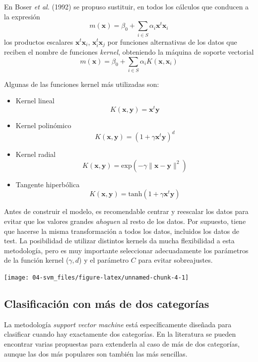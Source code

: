 \documentclass[
]{book}
\theoremstyle{break}
\theoremstyle{definition}
\theoremstyle{definition}
\theoremstyle{definition}
\theoremstyle{remark}
\begin{document}
En Boser \emph{et al.} (1992) se propuso sustituir, en todos los cálculos que conducen a la expresión
\[m(\mathbf{x}) = \beta_0 + \sum_{i\in S} \alpha_i \mathbf{x}^t \mathbf{x}_i\]
los productos escalares \(\mathbf{x}^t \mathbf{x}_i\), \(\mathbf{x}_i^t \mathbf{x}_j\) por funciones alternativas de los datos que reciben el nombre de funciones \emph{kernel}, obteniendo la máquina de soporte vectorial
\[m(\mathbf{x}) = \beta_0 + \sum_{i\in S} \alpha_i K(\mathbf{x}, \mathbf{x}_i)\]

Algunas de las funciones kernel más utilizadas son:

\begin{itemize}
\item
  Kernel lineal
  \[K(\mathbf{x}, \mathbf{y}) = \mathbf{x}^t \mathbf{y}\]
\item
  Kernel polinómico
  \[K(\mathbf{x}, \mathbf{y}) = (1 + \gamma \mathbf{x}^t \mathbf{y})^d\]
\item
  Kernel radial
  \[K(\mathbf{x}, \mathbf{y}) = \mbox{exp} (-\gamma \| \mathbf{x} - \mathbf{y} \|^2)\]
\item
  Tangente hiperbólica
  \[K(\mathbf{x}, \mathbf{y}) = \mbox{tanh} (1 + \gamma \mathbf{x}^t \mathbf{y})\]
\end{itemize}

Antes de construir el modelo, es recomendable centrar y reescalar los datos para evitar que los valores grandes \emph{ahoguen} al resto de los datos. Por supuesto, tiene que hacerse la misma transformación a todos los datos, incluidos los datos de test. La posibilidad de utilizar distintos kernels da mucha flexibilidad a esta metodología, pero es muy importante seleccionar adecuadamente los parámetros de la función kernel (\(\gamma,d\)) y el parámetro \(C\) para evitar sobreajustes.

\begin{center}\texttt{[image: 04-svm\_files/figure-latex/unnamed-chunk-4-1]} \end{center}

\hypertarget{clasificaciuxf3n-con-muxe1s-de-dos-categoruxedas}{%
\subsection{Clasificación con más de dos categorías}\label{clasificaciuxf3n-con-muxe1s-de-dos-categoruxedas}}

La metodología \emph{support vector machine} está específicamente diseñada para clasificar cuando hay exactamente dos categorías. En la literatura se pueden encontrar varias propuestas para extenderla al caso de más de dos categorías, aunque las dos más populares son también las más sencillas.
\end{document}
